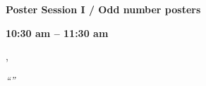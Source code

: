\documentclass{proc}
\begin{document}
\onecolumn
\begin{framed}
\begin{center}
\textbf{Poster Session I / Odd number posters}

\textbf{10:30 am -- 11:30 am }
\end{center}
\end{framed}

\begin{description}[leftmargin=4em,style=nextline]
\item[\textbf{P\VAR{p.number}}]
\textbf{}

\underline{}\textsuperscript{}, \textsuperscript{}

\emph{``'' }

\textsuperscript{}
\end{description}
\end{document}
